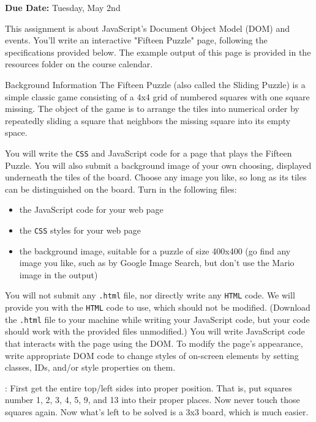 \documentclass[programming]{../../../../mfcs}
\newcommand{\projectduedate}{Tuesday, May 2nd}
\begin{document}
\vspace{-3.8em}

\hfill\begin{varwidth}{0.5\textwidth}
{\large {\bf\color{colour} Due Date:} \projectduedate}
\end{varwidth}
\vspace{2em}

This assignment is about JavaScript's Document Object Model (DOM) and events. You'll write an
interactive
"Fifteen Puzzle" page, following the specifications provided below. The example output of this page
is provided in the resources folder on the course calendar.

\vspace{1em}
\begin{question}{Background Information}
The Fifteen Puzzle (also called the Sliding Puzzle) is a simple classic game consisting of a 4x4 grid of numbered
squares with one square missing. The object of the game is to arrange the tiles into numerical order by repeatedly
sliding a square that neighbors the missing square into its empty space.
\newline

  You will write the \texttt{CSS} and JavaScript code for a page \texttt{\textbf{\color{colour}{fifteen.html}}} that plays the Fifteen Puzzle. You will also submit
a background image of your own choosing, displayed underneath the tiles of the board. Choose any image you
like, so long as its tiles can be distinguished on the board. Turn in the following files:
\begin{itemize}
  \item \texttt{\textbf{\color{colour}{fifteen.js}}} the JavaScript code for your web page
  \item \texttt{\textbf{\color{colour}{fifteen.css}}} the \texttt{CSS} styles for your web page
  \item \texttt{\textbf{\color{colour}{background.jpg}}} the background image, suitable for a puzzle of size 400x400 (go find any image you like, such as by Google Image Search, but don't
      use the Mario image in the output)
\end{itemize}

  You will not submit any \texttt{.html} file, nor directly write any \texttt{HTML} code. We will
  provide you with the \texttt{HTML} code to
  use, which should not be modified. (Download the \texttt{.html} file to your machine while writing your JavaScript code,
but your code should work with the provided files unmodified.) You will write JavaScript code that interacts with the
page using the DOM. To modify the page's appearance, write appropriate DOM code to change styles of on-screen
elements by setting classes, IDs, and/or style properties on them.
\newline

  \textbf{\color{colour}{Tip for playing the game}}: First get the entire top/left sides into proper position. That is, put squares number 1, 2, 3, 4, 5, 9, and 13
into their proper places. Now never touch those squares again. Now what's left to be solved is a 3x3 board, which is much easier.
\end{question}
\end{document}
